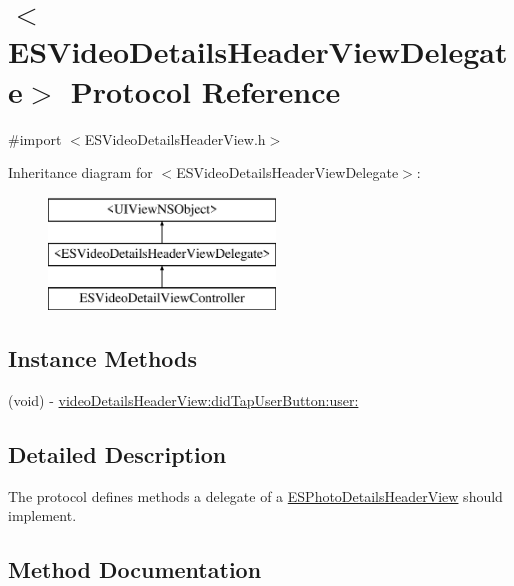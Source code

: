 \hypertarget{protocol_e_s_video_details_header_view_delegate-p}{}\section{$<$E\+S\+Video\+Details\+Header\+View\+Delegate$>$ Protocol Reference}
\label{protocol_e_s_video_details_header_view_delegate-p}


{\ttfamily \#import $<$E\+S\+Video\+Details\+Header\+View.\+h$>$}

Inheritance diagram for $<$E\+S\+Video\+Details\+Header\+View\+Delegate$>$\+:\begin{figure}[H]
\begin{center}
\leavevmode
\includegraphics[height=3.000000cm]{protocol_e_s_video_details_header_view_delegate-p}
\end{center}
\end{figure}
\subsection*{Instance Methods}
\begin{DoxyCompactItemize}
\item 
(void) -\/ \hyperlink{protocol_e_s_video_details_header_view_delegate-p_a2b4a354b7fe033914fc7c50d5a5a6e00}{video\+Details\+Header\+View\+:did\+Tap\+User\+Button\+:user\+:}
\end{DoxyCompactItemize}


\subsection{Detailed Description}
The protocol defines methods a delegate of a \hyperlink{interface_e_s_photo_details_header_view}{E\+S\+Photo\+Details\+Header\+View} should implement. 

\subsection{Method Documentation}
\hypertarget{protocol_e_s_video_details_header_view_delegate-p_a2b4a354b7fe033914fc7c50d5a5a6e00}{}
